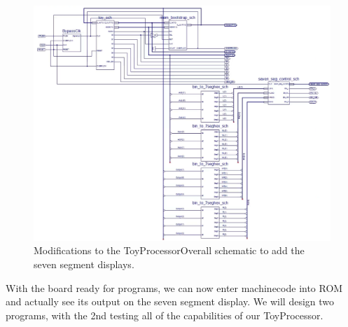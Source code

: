 \documentclass[12pt]{article}
\begin{document}
		 \begin{figure}[h]
		 	\includegraphics[scale=.5]{toyProcessor_Overall.PNG}
		 	\caption{Modifications to the ToyProcessorOverall schematic to add the seven segment displays.}
		 \end{figure}
\newpage

With the board ready for programs, we can now enter machinecode into ROM and actually see its output on the seven segment display. We will design two programs, with the 2nd testing all of the capabilities of our ToyProcessor.\\
\end{document}
